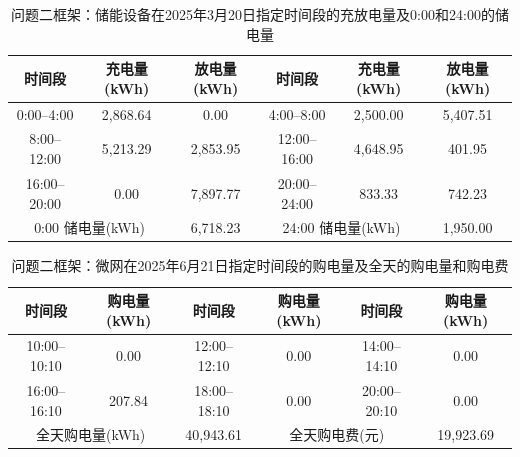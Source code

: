 \begin{table}[H]
  \centering
  \caption{问题二框架：储能设备在2025年3月20日指定时间段的充放电量及0:00和24:00的储电量}
  \label{tab:q4-2-storage-0320}
  \small
  \renewcommand{\arraystretch}{1.3}
  \begin{tabular}{|c|c|c|c|c|c|}
    \hline
    时间段 & 充电量(kWh) & 放电量(kWh) & 时间段 & 充电量(kWh) & 放电量(kWh) \\
    \hline
    0:00--4:00 & 2{,}868.64 & 0.00 & 4:00--8:00 & 2{,}500.00 & 5{,}407.51 \\
    \hline
    8:00--12:00 & 5{,}213.29 & 2{,}853.95 & 12:00--16:00 & 4{,}648.95 & 401.95 \\
    \hline
    16:00--20:00 & 0.00 & 7{,}897.77 & 20:00--24:00 & 833.33 & 742.23 \\
    \hline
    \multicolumn{2}{|c|}{0:00 储电量(kWh)} & \multicolumn{1}{c|}{6{,}718.23} & \multicolumn{2}{c|}{24:00 储电量(kWh)} & \multicolumn{1}{c|}{1{,}950.00} \\
    \hline
  \end{tabular}
\end{table}

\begin{table}[H]
  \centering
  \caption{问题二框架：微网在2025年6月21日指定时间段的购电量及全天的购电量和购电费}
  \label{tab:q4-2-purchase-0621}
  \small
  \renewcommand{\arraystretch}{1.3}
  \begin{tabular}{|c|c|c|c|c|c|}
    \hline
    时间段 & 购电量(kWh) & 时间段 & 购电量(kWh) & 时间段 & 购电量(kWh) \\
    \hline
    10:00--10:10 & 0.00 & 12:00--12:10 & 0.00 & 14:00--14:10 & 0.00 \\
    \hline
    16:00--16:10 & 207.84 & 18:00--18:10 & 0.00 & 20:00--20:10 & 0.00 \\
    \hline
    \multicolumn{2}{|c|}{全天购电量(kWh)} & \multicolumn{1}{c|}{40{,}943.61} & \multicolumn{2}{c|}{全天购电费(元)} & \multicolumn{1}{c|}{19{,}923.69} \\
    \hline
  \end{tabular}
\end{table}

